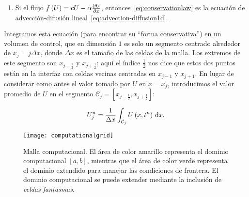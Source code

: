 \begin{frame}
\begin{alertblock}
\begin{enumerate}
			\item

			      Si el flujo
			      \begin{math}
				      f
				      \left(U\right)=
				      cU-
				      \alpha\diffp{U}{x}
			      \end{math},
			      entonces~\eqref{eq:conservationlaw} es la ecuación de
			      advección-difusión lineal~\eqref{eq:advection-diffusion1d}.
		\end{enumerate}
	\end{alertblock}
\end{frame}

\begin{frame}

	Integramos esta ecuación (para encontrar su ``forma conservativa'')
	en un volumen de control, que en dimensión $1$ es solo un segmento
	centrado alrededor de
	\begin{math}
		x_{j}=
		j\Delta x
	\end{math},
	donde $\Delta x$ es el tamaño de las celdas de la malla.
	Los extremos de este segmento son $x_{j-\frac{1}{2}}$ y
	$x_{j+\frac{1}{2}}$; aquí el índice $\frac{1}{2}$ nos dice que estos
	dos puntos están en la interfaz con celdas vecinas centradas en
	$x_{j-1}$ y $x_{j+1}$.
	En lugar de considerar como antes el valor tomado por $U$ en $x=x_{j}$,
	introducimos el valor promedio de $U$ en el segmento
	\begin{math}
		\mathcal{C}_{j}=
		\left[
			x_{j-\frac{1}{2}},
			x_{j+\frac{1}{2}}
			\right]
	\end{math}:

	\begin{equation*}
		U^{n}_{j}=
		\dfrac{1}{\Delta x}
		\int_{\mathcal{C}_{j}}
		U
		\left(x,t^{n}\right)
		\dl x.
	\end{equation*}

	\begin{figure}[ht!]
		\centering
		\texttt{[image: computationalgrid]}
		\caption{Malla computacional.
			El área de color amarillo representa el dominio computacional
			$\left[a,b\right]$, mientras que el área de color verde
			representa el dominio extendido para manejar las condiciones de
			frontera.
			El dominio computacional se puede extender mediante la inclusión
			de \emph{celdas fantasmas}.
		}
		\label{fig:piecewise}
	\end{figure}
\end{frame}

